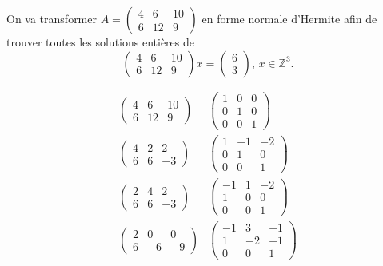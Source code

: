   \begin{example}
    \label{exe:29}
    On va transformer $A = \left(\begin{matrix}4 & 6 & 10\\6 & 12 & 9\end{matrix}\right)$ en forme normale d'Hermite afin de trouver toutes les solutions entières de
    \begin{equation}
      \label{eq:46}
      \left(\begin{matrix}4 & 6 & 10\\6 & 12 & 9\end{matrix}\right) x =
      \begin{pmatrix}
        6 \\ 3
      \end{pmatrix}, \, x ∈ ℤ^3. 
    \end{equation}
    
    \begin{equation}
      \label{eq:45}
      \begin{array}{cc}
      \left(\begin{matrix}4 & 6 & 10\\6 & 12 & 9\end{matrix}\right) &  
\left(\begin{matrix}1 & 0 & 0\\0 & 1 & 0\\0 & 0 & 1\end{matrix}\right) \\

\left(\begin{matrix}4 & 2 & 2\\6 & 6 & -3\end{matrix}\right) &  
\left(\begin{matrix}1 & -1 & -2\\0 & 1 & 0\\0 & 0 & 1\end{matrix}\right) \\

\left(\begin{matrix}2 & 4 & 2\\6 & 6 & -3\end{matrix}\right) &
\left(\begin{matrix}-1 & 1 & -2\\1 & 0 & 0\\0 & 0 & 1\end{matrix}\right)\\

\left(\begin{matrix}2 & 0 & 0\\6 & -6 & -9\end{matrix}\right)&
\left(\begin{matrix}-1 & 3 & -1\\1 & -2 & -1\\0 & 0 & 1\end{matrix}\right)\\


\end{array}
\end{equation}
\end{example}
